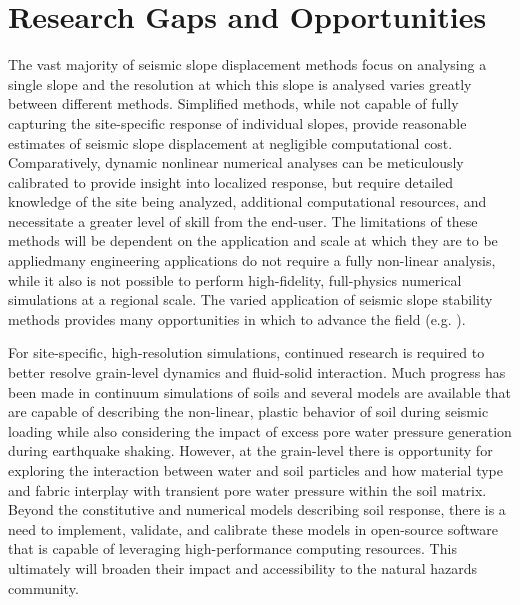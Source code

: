 \section{Research Gaps and Opportunities}
\label{sec:eq_landslide_research}
The vast majority of seismic slope displacement methods focus on analysing a single slope and the resolution at which this slope is analysed varies greatly between different methods. Simplified methods, while not capable of fully capturing the site-specific response of individual slopes, provide reasonable estimates of seismic slope displacement at negligible computational cost. Comparatively, dynamic nonlinear numerical analyses can be meticulously calibrated to provide insight into localized response, but require detailed knowledge of the site being analyzed, additional computational resources, and necessitate a greater level of skill from the end-user. The limitations of these methods will be dependent on the application and scale at which they are to be applied\textemdash many engineering applications do not require a fully non-linear analysis, while it also is not possible to perform high-fidelity, full-physics numerical simulations at a regional scale. The varied application of seismic slope stability methods provides many opportunities in which to advance the field (e.g. \cite{bray2017new}).

For site-specific, high-resolution simulations, continued research is required to better resolve grain-level dynamics and fluid-solid interaction. Much progress has been made in continuum simulations of soils and several models are available that are capable of describing the non-linear, plastic behavior of soil during seismic loading while also considering the impact of excess pore water pressure generation during earthquake shaking. However, at the grain-level there is opportunity for exploring the interaction between water and soil particles and how material type and fabric interplay with transient pore water pressure within the soil matrix. Beyond the constitutive and numerical models describing soil response, there is a need to implement, validate, and calibrate these models in open-source software that is capable of leveraging high-performance computing resources. This ultimately will broaden their impact and accessibility to the natural hazards community.

